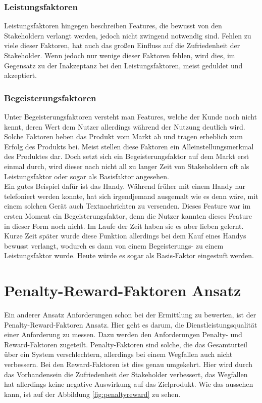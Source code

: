 \subsubsection{Leistungsfaktoren}
Leistungsfaktoren hingegen beschreiben Features, die bewusst von den Stakeholdern verlangt werden, jedoch nicht zwingend notwendig sind. Fehlen zu viele dieser Faktoren, hat auch das großen Einfluss auf die Zufriedenheit der Stakeholder. Wenn jedoch nur wenige dieser Faktoren fehlen, wird dies, im Gegensatz zu der Inakzeptanz bei den Leistungsfaktoren, meist geduldet und akzeptiert.

\subsubsection{Begeisterungsfaktoren}
Unter Begeisterungsfaktoren versteht man Features, welche der Kunde noch nicht kennt, deren Wert dem Nutzer allerdings während der Nutzung deutlich wird. Solche Faktoren heben das Produkt vom Markt ab und tragen erheblich zum Erfolg des Produkts bei. Meist stellen diese Faktoren ein Alleinstellungsmerkmal des Produktes dar. Doch setzt sich ein Begeisterungsfaktor auf dem Markt erst einmal durch, wird dieser nach nicht all zu langer Zeit von Stakeholdern oft als Leistungsfaktor oder sogar als Basisfaktor angesehen.\\

Ein gutes Beispiel dafür ist das Handy. Während früher mit einem Handy nur telefoniert werden konnte, hat sich irgendjemand ausgemalt wie es denn wäre, mit einem solchen Gerät auch Textnachrichten zu versenden. Dieses Feature war im ersten Moment ein Begeisterungsfaktor, denn die Nutzer kannten dieses Feature in dieser Form noch nicht. Im Laufe der Zeit haben sie es aber lieben gelernt. Kurze Zeit später wurde diese Funktion allerdings bei dem Kauf eines Handys bewusst verlangt, wodurch es dann von einem Begeisterungs- zu einem Leistungsfaktor wurde. Heute würde es sogar als Basis-Faktor eingestuft werden.

\section{Penalty-Reward-Faktoren Ansatz}
Ein anderer Ansatz Anforderungen schon bei der Ermittlung zu bewerten, ist der Penalty-Reward-Faktoren Ansatz. Hier geht es darum, die Dienstleistungsqualität einer Anforderung zu messen. Dazu werden den Anforderungen Penalty- und Reward-Faktoren zugeteilt. Penalty-Faktoren sind solche, die das Gesamturteil über ein System verschlechtern, allerdings bei einem Wegfallen auch nicht verbessern. Bei den Reward-Faktoren ist dies genau umgekehrt. Hier wird durch das Vorhandensein die Zufriedenheit der Stakeholder verbessert, das Wegfallen hat allerdings keine negative Auswirkung auf das Zielprodukt. Wie das aussehen kann, ist auf der Abbildung \ref{fig:penaltyreward} zu sehen.

